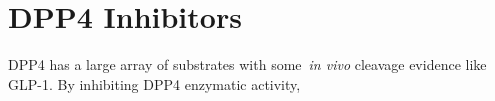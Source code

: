 \section{DPP4 Inhibitors}
DPP4 has a large array of substrates with some~\textit{in vivo} cleavage evidence like GLP-1. By inhibiting DPP4 enzymatic activity, 